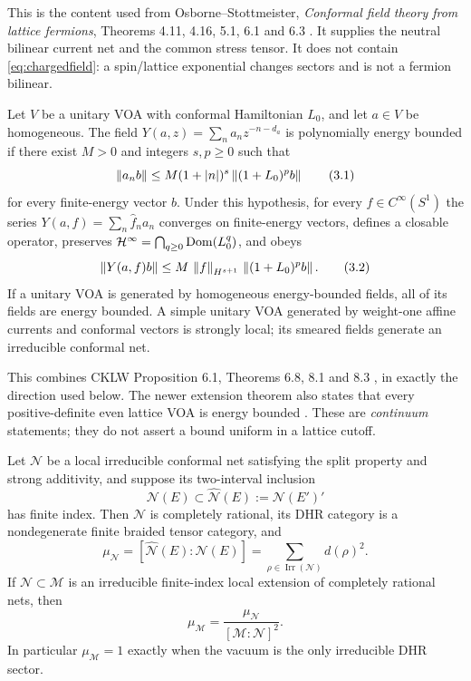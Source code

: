 This is the content used from Osborne--Stottmeister,
\emph{Conformal field theory from lattice fermions},
Theorems 4.11, 4.16, 5.1, 6.1 and 6.3
\cite{OsborneStottmeister}.  It supplies the neutral bilinear current net
and the common stress tensor.  It does not contain
\eqref{eq:chargedfield}: a spin/lattice exponential changes sectors and
is not a fermion bilinear.

\begin{theorem}
\label{thm:CKLWenergy}
Let $V$ be a unitary VOA with conformal Hamiltonian $L_0$, and let
$a\in V$ be homogeneous.  The field $Y(a,z)=\sum_na_nz^{-n-d_a}$
is polynomially energy bounded if there exist $M>0$ and integers
$s,p\ge0$ such that
\[
 \left\lVert a_n b\right\rVert
 \le M(1+|n|)^s\left\lVert(1+L_0)^p b\right\rVert
\tag{3.1}\label{eq:modebound}
\]
for every finite-energy vector $b$.  Under this hypothesis, for every
$f\in C^\infty(S^1)$ the series
$Y(a,f)=\sum_n\widehat f_n a_n$ converges on finite-energy vectors,
defines a closable operator, preserves
$\mathcal H^\infty=\bigcap_{q\ge0}\operatorname{Dom}(L_0^q)$, and obeys
\[
 \left\lVert Y(a,f)b\right\rVert
 \le M\,\left\lVert f\right\rVert_{H^{s+1}}\,
       \left\lVert(1+L_0)^p b\right\rVert.
\tag{3.2}\label{eq:smearedbound}
\]
If a unitary VOA is generated by homogeneous energy-bounded fields, all
of its fields are energy bounded.  A simple unitary VOA generated by
weight-one affine currents and conformal vectors is strongly local; its
smeared fields generate an irreducible conformal net.
\end{theorem}

This combines CKLW Proposition 6.1, Theorems 6.8, 8.1 and 8.3
\cite{CKLW}, in exactly the direction used below.  The newer extension
theorem also states that every positive-definite even lattice VOA is
energy bounded \cite[Proposition 4.2]{CarpiTomassini}.  These are
\emph{continuum} statements; they do not assert a bound uniform in a
lattice cutoff.

\begin{theorem}
\label{thm:KLM}
Let $\mathcal N$ be a local irreducible conformal net satisfying the split
property and strong additivity, and suppose its two-interval inclusion
\[
 \mathcal N(E)\subset\widehat{\mathcal N}(E)
 :=\mathcal N(E')'
\]
has finite index.  Then $\mathcal N$ is completely rational, its DHR
category is a nondegenerate finite braided tensor category, and
\[
 \mu_{\mathcal N}
 =[\widehat{\mathcal N}(E):\mathcal N(E)]
 =\sum_{\rho\in\operatorname{Irr}(\mathcal N)}d(\rho)^2.
\tag{3.3}\label{eq:KLMsum}
\]
If $\mathcal N\subset\mathcal M$ is an irreducible finite-index local
extension of completely rational nets, then
\[
 \mu_{\mathcal M}
 =\frac{\mu_{\mathcal N}}{[\mathcal M:\mathcal N]^2}.
\tag{3.4}\label{eq:KLMextension}
\]
In particular $\mu_{\mathcal M}=1$ exactly when the vacuum is the only
irreducible DHR sector.
\end{theorem}

